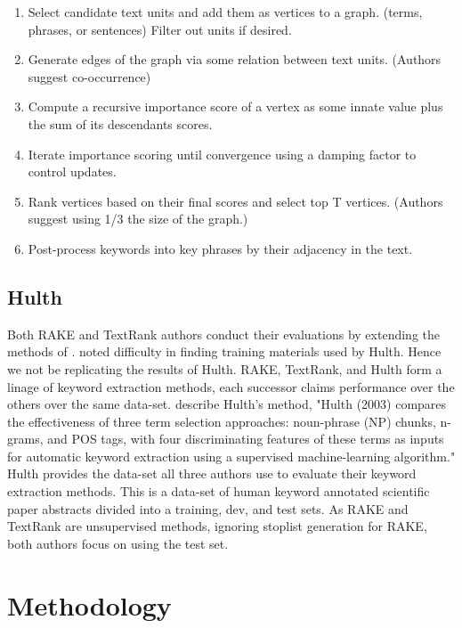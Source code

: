 \documentclass[11pt,a4paper]{article}
\begin{document}
\begin{enumerate}
\small \itemsep0em 

\item Select candidate text units and add them as vertices to a graph. (terms, phrases, or sentences) Filter out units if desired. 
\item Generate edges of the graph via some relation between text units. (Authors suggest co-occurrence)
\item Compute a recursive importance score of a vertex as some innate value plus the sum of its descendants scores.    
\item Iterate importance scoring until convergence using a damping factor to control updates.
\item Rank vertices based on their final scores and select top T vertices. (Authors suggest using 1/3 the size of the graph.)
\item Post-process keywords into key phrases by their adjacency in the text.

\normalsize
\end{enumerate}   

\subsection{Hulth}

Both RAKE and TextRank authors conduct their evaluations by extending the methods of \citet{hulth-2003-improved}. \citet{1} noted difficulty in finding training materials used by Hulth. Hence we not be replicating the results of Hulth. RAKE, TextRank, and Hulth form a linage of keyword extraction methods, each successor claims performance over the others over the same data-set. \citet{1} describe Hulth's method, "Hulth (2003) compares the effectiveness of three term selection approaches: noun-phrase (NP) chunks, n-grams, and POS tags, with four discriminating features of these terms as inputs for automatic keyword extraction using a supervised machine-learning algorithm." Hulth provides the data-set all three authors use to evaluate their keyword extraction methods. This is a data-set of human keyword annotated scientific paper abstracts divided into a training, dev, and test sets. As RAKE and TextRank are unsupervised methods, ignoring stoplist generation for RAKE, both authors focus on using the test set. 

\section{Methodology}
\end{document}
